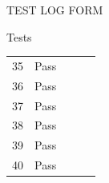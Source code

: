 \documentclass{article}
\begin{document}
\begin{section}{TEST LOG FORM}
\begin{subsection}{Tests}
\begin{tabularx}{\linewidth}{| p{1.5cm} | p{2cm} | p{7.5cm} | p{2cm} | X |}
&

&

\\
\hline

35
&
Pass
&

&

&

\\
\hline

36
&
Pass
&

&

&

\\
\hline

37
&
Pass
&

&

&

\\
\hline

38
&
Pass
&

&

&

\\
\hline

39
&
Pass
&

&

&

\\
\hline

40
&
Pass
&

&

&

\\
\hline

			\end{tabularx}
		\end{subsection}
	\end{section}
	
	\newpage
	
\end{document}
